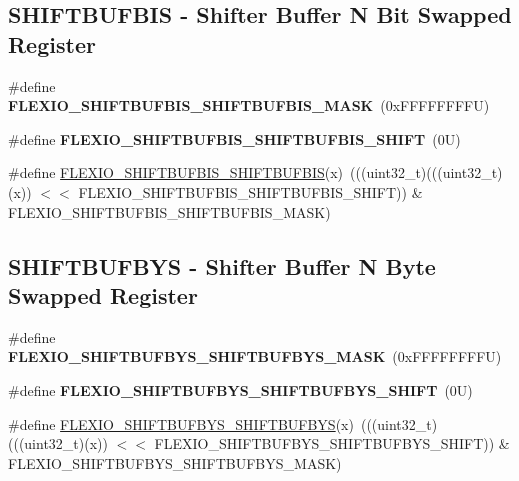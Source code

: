 \subsection*{S\+H\+I\+F\+T\+B\+U\+F\+B\+IS -\/ Shifter Buffer N Bit Swapped Register}
\begin{DoxyCompactItemize}
\item 
\mbox{\label{group___f_l_e_x_i_o___register___masks_gaa579e40126afbe89ad3022989ac2e15e}} 
\#define {\bfseries F\+L\+E\+X\+I\+O\+\_\+\+S\+H\+I\+F\+T\+B\+U\+F\+B\+I\+S\+\_\+\+S\+H\+I\+F\+T\+B\+U\+F\+B\+I\+S\+\_\+\+M\+A\+SK}~(0x\+F\+F\+F\+F\+F\+F\+F\+F\+U)
\item 
\mbox{\label{group___f_l_e_x_i_o___register___masks_gaa5924286f944e2bc4ad1fbd438038b84}} 
\#define {\bfseries F\+L\+E\+X\+I\+O\+\_\+\+S\+H\+I\+F\+T\+B\+U\+F\+B\+I\+S\+\_\+\+S\+H\+I\+F\+T\+B\+U\+F\+B\+I\+S\+\_\+\+S\+H\+I\+FT}~(0\+U)
\item 
\#define \mbox{\hyperlink{group___f_l_e_x_i_o___register___masks_ga61abe03ea6ee0e08656a765e6b996e19}{F\+L\+E\+X\+I\+O\+\_\+\+S\+H\+I\+F\+T\+B\+U\+F\+B\+I\+S\+\_\+\+S\+H\+I\+F\+T\+B\+U\+F\+B\+IS}}(x)~(((uint32\+\_\+t)(((uint32\+\_\+t)(x)) $<$$<$ F\+L\+E\+X\+I\+O\+\_\+\+S\+H\+I\+F\+T\+B\+U\+F\+B\+I\+S\+\_\+\+S\+H\+I\+F\+T\+B\+U\+F\+B\+I\+S\+\_\+\+S\+H\+I\+FT)) \& F\+L\+E\+X\+I\+O\+\_\+\+S\+H\+I\+F\+T\+B\+U\+F\+B\+I\+S\+\_\+\+S\+H\+I\+F\+T\+B\+U\+F\+B\+I\+S\+\_\+\+M\+A\+SK)
\end{DoxyCompactItemize}
\subsection*{S\+H\+I\+F\+T\+B\+U\+F\+B\+YS -\/ Shifter Buffer N Byte Swapped Register}
\begin{DoxyCompactItemize}
\item 
\mbox{\label{group___f_l_e_x_i_o___register___masks_ga205cfe7bb3aefd03a587afb8b5089e0e}} 
\#define {\bfseries F\+L\+E\+X\+I\+O\+\_\+\+S\+H\+I\+F\+T\+B\+U\+F\+B\+Y\+S\+\_\+\+S\+H\+I\+F\+T\+B\+U\+F\+B\+Y\+S\+\_\+\+M\+A\+SK}~(0x\+F\+F\+F\+F\+F\+F\+F\+F\+U)
\item 
\mbox{\label{group___f_l_e_x_i_o___register___masks_gac8964f78f70c9ca3302afc949379e2d0}} 
\#define {\bfseries F\+L\+E\+X\+I\+O\+\_\+\+S\+H\+I\+F\+T\+B\+U\+F\+B\+Y\+S\+\_\+\+S\+H\+I\+F\+T\+B\+U\+F\+B\+Y\+S\+\_\+\+S\+H\+I\+FT}~(0\+U)
\item 
\#define \mbox{\hyperlink{group___f_l_e_x_i_o___register___masks_gaa15951dcd7608ac15e7936551a8a24bc}{F\+L\+E\+X\+I\+O\+\_\+\+S\+H\+I\+F\+T\+B\+U\+F\+B\+Y\+S\+\_\+\+S\+H\+I\+F\+T\+B\+U\+F\+B\+YS}}(x)~(((uint32\+\_\+t)(((uint32\+\_\+t)(x)) $<$$<$ F\+L\+E\+X\+I\+O\+\_\+\+S\+H\+I\+F\+T\+B\+U\+F\+B\+Y\+S\+\_\+\+S\+H\+I\+F\+T\+B\+U\+F\+B\+Y\+S\+\_\+\+S\+H\+I\+FT)) \& F\+L\+E\+X\+I\+O\+\_\+\+S\+H\+I\+F\+T\+B\+U\+F\+B\+Y\+S\+\_\+\+S\+H\+I\+F\+T\+B\+U\+F\+B\+Y\+S\+\_\+\+M\+A\+SK)
\end{DoxyCompactItemize}
